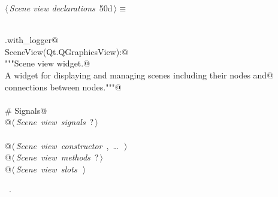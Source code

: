 \documentclass[
    a4paper,      %
    10pt,         %
    openright,    %
    notitlepage,  %
    parskip=half, %
]{scrreprt}       %
\theoremstyle{definition}                    %
\begin{document}
\begin{flushleft} \small
\begin{minipage}{\linewidth}\label{scrap72}\raggedright\small
{} $\langle\,${\itshape Scene view declarations}\nobreak\ {\footnotesize {50d}}$\,\rangle\equiv$
\vspace{-1exm}
\begin{list}{}{} \item
\mbox{}\lstinline@@\\
\mbox{}\lstinline@common.with_logger@\\
\mbox{}\lstinline@class SceneView(Qt.QGraphicsView):@\\
\mbox{}\lstinline@    """Scene view widget.@\\
\mbox{}\lstinline@    A widget for displaying and managing scenes including their nodes and@\\
\mbox{}\lstinline@    connections between nodes."""@\\
\mbox{}\lstinline@@\\
\mbox{}\lstinline@    # Signals@\\
\mbox{}\lstinline@    @\hbox{$\langle\,${\itshape Scene view signals}\nobreak\ {\footnotesize ?}$\,\rangle$}\lstinline@@\\
\mbox{}\lstinline@@\\
\mbox{}\lstinline@    @\hbox{$\langle\,${\itshape Scene view constructor}\nobreak\ {\footnotesize {}, \ldots\ }$\,\rangle$}\lstinline@@\\
\mbox{}\lstinline@    @\hbox{$\langle\,${\itshape Scene view methods}\nobreak\ {\footnotesize ?}$\,\rangle$}\lstinline@@\\
\mbox{}\lstinline@    @\hbox{$\langle\,${\itshape Scene view slots}\nobreak\ {\footnotesize {}}$\,\rangle$}\lstinline@@\\
\mbox{}\lstinline@@{\NWsep}
\end{list}
\vspace{-1.5ex}
\footnotesize
\begin{list}{}{\setlength{\itemsep}{-\parsep}\setlength{\itemindent}{-\leftmargin}}
\item \NWtxtMacroRefIn\ .

\item{}
\end{list}
\end{minipage}\vspace{4ex}
\end{flushleft}
\end{document}
